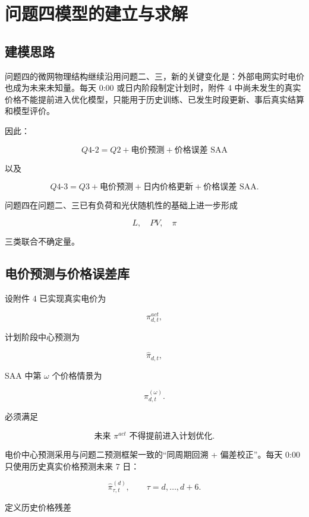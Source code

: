 \section{问题四模型的建立与求解}

\subsection{建模思路}

问题四的微网物理结构继续沿用问题二、三，新的关键变化是：外部电网实时电价也成为未来未知量。每天 0:00 或日内阶段制定计划时，附件 4 中尚未发生的真实价格不能提前进入优化模型，只能用于历史训练、已发生时段更新、事后真实结算和模型评价。

因此：

\[
\boxed{
Q4\text{-}2
=
Q2
+
\text{电价预测}
+
\text{价格误差 SAA}
}
\]

以及

\[
\boxed{
Q4\text{-}3
=
Q3
+
\text{电价预测}
+
\text{日内价格更新}
+
\text{价格误差 SAA}
}.
\]

问题四在问题二、三已有负荷和光伏随机性的基础上进一步形成

\[
L,\quad PV,\quad \pi
\]

三类联合不确定量。

\subsection{电价预测与价格误差库}

设附件 4 已实现真实电价为

\[
\pi^{act}_{d,t},
\]

计划阶段中心预测为

\[
\hat\pi_{d,t},
\]

SAA 中第 \(\omega\) 个价格情景为

\[
\pi^{(\omega)}_{d,t}.
\]

必须满足

\begin{equation}
\boxed{
\text{未来 }\pi^{act}\text{ 不得提前进入计划优化}
}.
\end{equation}

电价中心预测采用与问题二预测框架一致的“同周期回溯 + 偏差校正”。每天 0:00 只使用历史真实价格预测未来 7 日：

\begin{equation}
\hat\pi_{\tau,t}^{(d)},
\qquad
\tau=d,\ldots,d+6.
\end{equation}

定义历史价格残差

